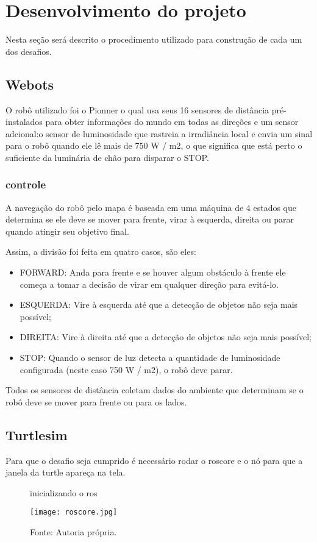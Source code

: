 \chapter{Desenvolvimento do projeto}
\label{chap:metod}
Nesta seção será descrito o procedimento utilizado para construção de cada um dos desafios.

\section{Webots}
O robô utilizado foi o Pionner o qual usa seus 16 sensores de distância pré-instalados para obter informações do mundo em todas as direções 
e um sensor adcional:o sensor de luminosidade que rastreia a irradiância local e envia um sinal para o robô quando ele lê mais de 750 W / m2, 
o que significa que está perto o suficiente da luminária de chão para disparar o STOP.

\subsection{controle}
A navegação do robô pelo mapa é baseada em uma máquina de 4 estados que determina se ele deve se mover para frente,
virar à esquerda, direita ou parar quando atingir seu objetivo final.

Assim, a divisão foi feita em quatro casos, são eles:
\begin{itemize}
    \item FORWARD: Anda para frente e se houver algum obstáculo à frente ele começa a tomar a decisão de virar em qualquer direção para evitá-lo.
    \item ESQUERDA: Vire à esquerda até que a detecção de objetos não seja mais possível;
    \item DIREITA: Vire à direita até que a detecção de objetos não seja mais possível;
    \item STOP: Quando o sensor de luz detecta a quantidade de luminosidade configurada (neste caso 750 W / m2), o robô deve parar.
\end{itemize}
Todos os sensores de distância coletam dados do ambiente que determinam se o robô deve se mover para frente ou para os lados.
\section{Turtlesim}
Para que o desafio seja cumprido é necessário rodar o roscore e o nó para que a janela da turtle apareça na tela.

\begin{figure} [h!]	
    \centering
    \caption{inicializando o ros}
    \texttt{[image: roscore.jpg]}
    \caption*{Fonte: Autoria própria.}
    \label{fig:roscore}
\end{figure}

